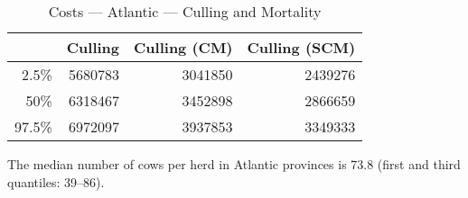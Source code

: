 \documentclass{article}\usepackage[]{graphicx}\usepackage[]{color}
\begin{document}
\begin{table}[ht]
\centering
\begin{tabular}{rrrr}
  \hline
 & Culling & Culling (CM) & Culling (SCM) \\ 
  \hline
2.5\% & 5680783 & 3041850 & 2439276 \\ 
  50\% & 6318467 & 3452898 & 2866659 \\ 
  97.5\% & 6972097 & 3937853 & 3349333 \\ 
   \hline
\end{tabular}
\caption{Costs --- Atlantic --- Culling and Mortality} 
\label{tab:atlantic:c}
\end{table}


The median number of cows per herd in Atlantic provinces is
73.8 (first and third quantiles:
39--86).
\clearpage
\end{document}

